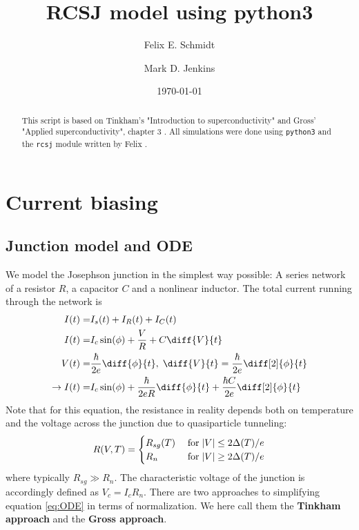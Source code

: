 \documentclass[reprint,onecolumn,%
amsmath,amssymb,aip,apl]{revtex4-1}
\DeclarePairedDelimiter\abs{\lvert}{\rvert} %
\begin{document}
	\title{RCSJ model using python3}
	\author{Felix E. Schmidt}
	\author{Mark D. Jenkins}
	\date{\today}

	\begin{abstract}
		This script is based on Tinkham's "Introduction to superconductivity"\cite{tinkham} and Gross' "Applied superconductivity", chapter 3 \cite{gross}.
		All simulations were done using \texttt{python3} and the \texttt{rcsj} module written by Felix \cite{rcsj}.
	\end{abstract}	
	
	\maketitle
	\tableofcontents
	
	
	\section{Current biasing}
	\subsection{Junction model and ODE}
	We model the Josephson junction in the simplest way possible:
	A series network of a resistor $R$, a capacitor $C$ and a nonlinear inductor.
	The total current running through the network is
	\begin{eqnarray}
	I(t) =& I_s(t) + I_R(t) + I_C(t) \\%
	I(t) =& I_c\sin(\phi) + \frac{V}{R} + C\diff{V}{t} \\%
	V(t) =& \frac{\hbar}{2e}\diff{\phi}{t}, \; \diff{V}{t} = \frac{\hbar}{2e} \diff[2]{\phi}{t} \\%
	\rightarrow I(t) =& I_c\sin(\phi)+\frac{\hbar}{2eR}\diff{\phi}{t}+\frac{\hbar C}{2e}\diff[2]{\phi}{t}
	\label{eq:ODE}
	\end{eqnarray}
	Note that for this equation, the resistance in reality depends both on temperature and the voltage across the junction due to quasiparticle tunneling:
	\begin{eqnarray}
	R(V,T) = \begin{cases}
	R_{sg}(T) \; &{\rm for \;} \abs{V} \leq 2\Delta(T)/e \\%
	R_{n} \; &{\rm for \;} \abs{V} \geq 2\Delta(T)/e \\%
	\end{cases}
	\end{eqnarray}
	where typically $R_{sg} \gg R_n$.
	The characteristic voltage of the junction is accordingly defined as $V_c=I_c R_n$.
	There are two approaches to simplifying equation \ref{eq:ODE} in terms of normalization.
	We here call them the \textbf{Tinkham approach}\cite{tinkham} and the \textbf{Gross approach}\cite{gross}.
	
\end{document}

